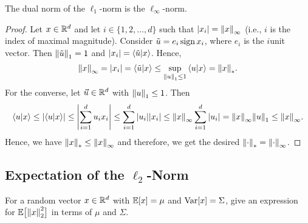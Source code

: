         \begin{solution}
            The dual norm of the \(\ell_1\)-norm is the \(\ell_\infty\)-norm.
            \begin{proof}
                Let \(x \in \mathbb{R}^d\) and let \(i \in \{ 1, 2, \dots, d \}\) such that \(\abs{x_i} = \norm{x}_\infty\) (i.e., \(i\) is the index of maximal magnitude). Consider \(\tilde{u} = e_i \operatorname{sign} x_i\), where \(e_i\) is the \(i\)\th unit vector. Then \(\norm{\tilde{u}}_1 = 1\) and \(\abs{x_i} = \ip{\tilde{u}}{x}\). Hence,
                \begin{equation}
                    \norm{x}_\infty
                        = \abs{x_i}
                        = \ip{\tilde{u}}{x}
                        \leq \sup_{\norm{u}_1 \leq 1} \ip{u}{x}
                        = \norm{x}_\ast.
                \end{equation}
                For the converse, let \(\vec{u} \in \mathbb{R}^d\) with \(\norm{u}_1 \leq 1\). Then
                \begin{equation}
                    \ip{u}{x}
                        \leq \abs{\ip{u}{x}}
                        \leq \abs{\sum_{i = 1}^{d} u_i x_i}
                        \leq \sum_{i = 1}^{d} \abs{u_i} \abs{x_i}
                        \leq \norm{x}_\infty \sum_{i = 1}^{d} \abs{u_i}
                        = \norm{x}_\infty \norm{u}_1
                        \leq \norm{x}_\infty.
                \end{equation}
                Hence, we have \( \norm{x}_\ast \leq \norm{x}_\infty \) and therefore, we get the desired \(\norm{\cdot}_\ast = \norm{\cdot}_\infty\).
            \end{proof}
        \end{solution}

    \subsection{Expectation of the \texorpdfstring{\(\ell_2\)}{l2}-Norm}
        For a random vector \(x \in \mathbb{R}^d\) with \(\mathbb{E}[x] = \mu\) and \(\operatorname{Var}[x] = \Sigma\), give an expression for \(\mathbb{E}\bigl[ \norm{x}_2^2 \bigr]\) in terms of \(\mu\) and \(\Sigma\).

